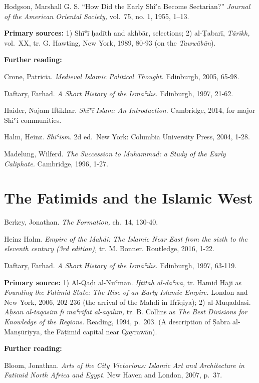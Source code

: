 \documentclass[
]{book}
\begin{document}
Hodgson, Marshall G. S. ``How Did the Early Shî'a Become
Sectarian?'' \emph{Journal of the American Oriental Society,} vol.~75, no. 1, 1955, 1--13.

\textbf{Primary sources:} 1) Shīʿī ḥadīth and akhbār, selections; 2)
al-Ṭabarī, \emph{Tārīkh,} vol.~XX, tr. G. Hawting, New York, 1989, 80-93 (on
the \emph{Tawwābūn}).

\textbf{Further reading:}

Crone, Patricia. \emph{Medieval Islamic Political Thought.} Edinburgh, 2005,
65-98.

Daftary, Farhad. \emph{A Short History of the Ismāʿīlīs.} Edinburgh, 1997,
21-62.

Haider, Najam Iftikhar. \emph{Shīʿī Islam: An Introduction}. Cambridge, 2014,
for major Shiʿi communities.

Halm, Heinz. \emph{Shiʿism}. 2d ed.~New York: Columbia University Press, 2004, 1-28.

Madelung, Wilferd. \emph{The Succession to Muhammad: a Study of the Early Caliphate.} Cambridge, 1996, 1-27.

\hypertarget{the-fatimids-and-the-islamic-west}{%
\chapter{The Fatimids and the Islamic West}\label{the-fatimids-and-the-islamic-west}}

Berkey, Jonathan. \emph{The Formation,} ch.~14, 130-40.

Heinz Halm. \emph{Empire of the Mahdi: The Islamic Near East from the sixth to the eleventh century (3rd edition),} tr. M. Bonner. Routledge, 2016, 1-22.

Daftary, Farhad. \emph{A Short History of the Ismāʿīlīs.} Edinburgh, 1997, 63-119.

\textbf{Primary source:} 1) Al-Qāḍī al-Nuʿmān. \emph{Iftitāḥ al-daʿwa,} tr. Hamid
Haji as \emph{Founding the Fatimid State: The Rise of an Early Islamic
Empire.} London and New York, 2006, 202-236 (the arrival of the Mahdi in
Ifrīqiya); 2) al-Muqaddasi. \emph{Aḥsan al-taqāsim fī maʿrifat al-aqālīm,}
tr. B. Collins as \emph{The Best Divisions for Knowledge of the Regions.}
Reading, 1994, p.~203. (A description of Ṣabra al-Manṣūriyya, the
Fāṭimid capital near Qayrawān).

\textbf{Further reading:}

Bloom, Jonathan. \emph{Arts of the City Victorious: Islamic Art and Architecture in Fatimid North Africa and Egypt.} New Haven and London, 2007, p.~37.
\end{document}
